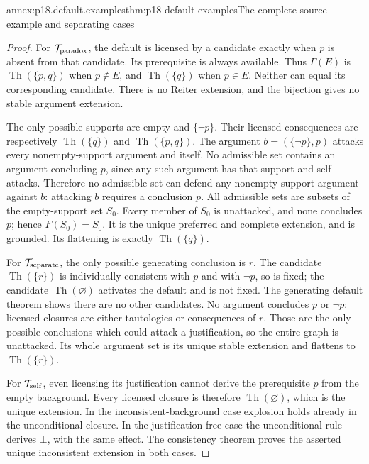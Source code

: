 \begin{annexitem}{annex:p18.default.examples}{thm:p18-default-examples}{The complete source example and separating cases}
\begin{proof}
For \(\mathcal T_{\rm paradox}\),
the default is licensed by a
candidate exactly when \(p\)
is absent from that candidate.
Its prerequisite is always
available. Thus \(\Gamma(E)\)
is \(\operatorname{Th}(\{p,q\})\)
when \(p\notin E\), and
\(\operatorname{Th}(\{q\})\)
when \(p\in E\). Neither
can equal its corresponding
candidate. There is no
Reiter extension, and the
bijection gives no stable
argument extension.

The only possible supports
are empty and \(\{\neg p\}\).
Their licensed consequences
are respectively
\(\operatorname{Th}(\{q\})\)
and \(\operatorname{Th}(\{p,q\})\).
The argument
\(b=(\{\neg p\},p)\)
attacks every nonempty-support
argument and itself.
No admissible set contains
an argument concluding \(p\),
since any such argument
has that support and
self-attacks. Therefore no
admissible set can defend
any nonempty-support argument
against \(b\): attacking
\(b\) requires a conclusion
\(p\). All admissible
sets are subsets of the
empty-support set \(S_0\).
Every member of \(S_0\)
is unattacked, and none
concludes \(p\); hence
\(F(S_0)=S_0\). It is
the unique preferred and
complete extension, and
is grounded. Its flattening
is exactly \(\operatorname{Th}(\{q\})\).

For \(\mathcal T_{\rm separate}\),
the only possible generating
conclusion is \(r\). The
candidate \(\operatorname{Th}(\{r\})\)
is individually consistent
with \(p\) and with \(\neg p\),
so is fixed; the candidate
\(\operatorname{Th}(\varnothing)\)
activates the default and
is not fixed. The generating
default theorem shows there
are no other candidates.
No argument concludes \(p\)
or \(\neg p\): licensed
closures are either tautologies
or consequences of \(r\).
Those are the only possible
conclusions which could attack
a justification, so the
entire graph is unattacked.
Its whole argument set
is its unique stable
extension and flattens
to \(\operatorname{Th}(\{r\})\).

For \(\mathcal T_{\rm self}\),
even licensing its justification
cannot derive the prerequisite
\(p\) from the empty background.
Every licensed closure is
therefore \(\operatorname{Th}(\varnothing)\),
which is the unique extension.
In the inconsistent-background
case explosion holds already
in the unconditional closure.
In the justification-free case
the unconditional rule derives
\(\bot\), with the same effect.
The consistency theorem proves
the asserted unique inconsistent
extension in both cases.
\end{proof}
\end{annexitem}

